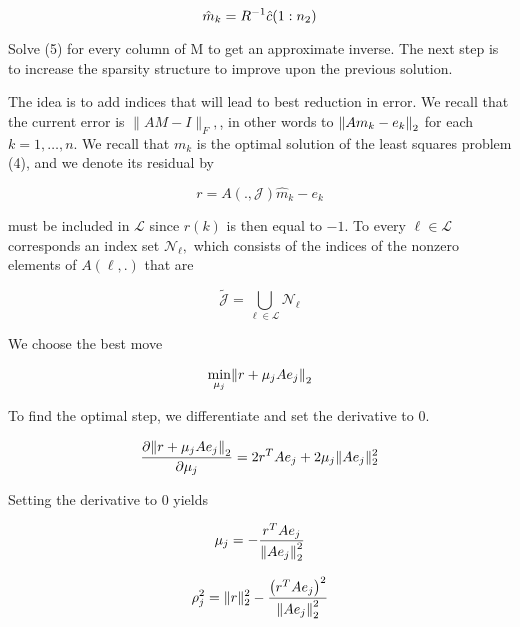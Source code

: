 \documentclass[paper=A4, fontsize=11pt]{scrartcl}
\let\originalleft\left
\let\originalright\right
\renewcommand{\left}{\mathopen{}\mathclose\bgroup\originalleft}
\renewcommand{\right}{\aftergroup\egroup\originalright}
\theoremstyle{remark}
\begin{document}
\begin{equation}
\hat{m}_{k}=R^{-1} \hat{c}\left(1 : n_{2}\right)
\end{equation}

Solve (5) for every column of M to get an approximate inverse. The next 
step is to increase the sparsity structure to improve upon the previous solution.

The idea is to add indices that will lead to best reduction in error. We recall that the current error is \(\|A M-I\|_{F},\), in other words to \(\left\|A m_{k}-e_{k}\right\|_{2}\) for each \(k=1, \ldots, n .\) We recall that \(m_{k}\) is the optimal solution of the least squares problem (4), and we denote its residual by

\begin{equation}
r=A( ., \mathcal{J}) \hat{m}_{k}-e_{k}
\end{equation}

must be included in \(\mathcal{L}\) since \(r(k)\) is then equal to \(-1 .\) To every \(\ell \in \mathcal{L}\) corresponds an
index set \(\mathcal{N}_{\ell},\) which consists of the indices of the nonzero elements of \(A(\ell, .)\) that are


\begin{equation}
\tilde{\mathcal{J}}=\bigcup_{\ell \in \mathcal{L}} \mathcal{N}_{\ell}
\end{equation}

We choose the best move

\begin{equation}
\min _{\mu_{j}}\left\|r+\mu_{j} A e_{j}\right\|_{2}
\end{equation}

To find the optimal step, we differentiate and set the derivative to 0. 

\begin{equation}
\begin{aligned}
\frac{\partial \left\|r+\mu_{j} A e_{j}\right\|_{2}}{\partial \mu_{j}} 
& = 2r^{T} A e_{j} + 2\mu_{j}\|A e_{j}\|_{2}^{2}\\
\end{aligned}
\end{equation}

Setting the derivative to $0$ yields

\begin{equation}
\mu_{j}=-\frac{r^{T} A e_{j}}{\left\|A e_{j}\right\|_{2}^{2}}
\end{equation}

\begin{equation}
\rho_{j}^{2}=\|r\|_{2}^{2}-\frac{\left(r^{T} A e_{j}\right)^{2}}{\left\|A e_{j}\right\|_{2}^{2}}
\end{equation}
\end{document}
